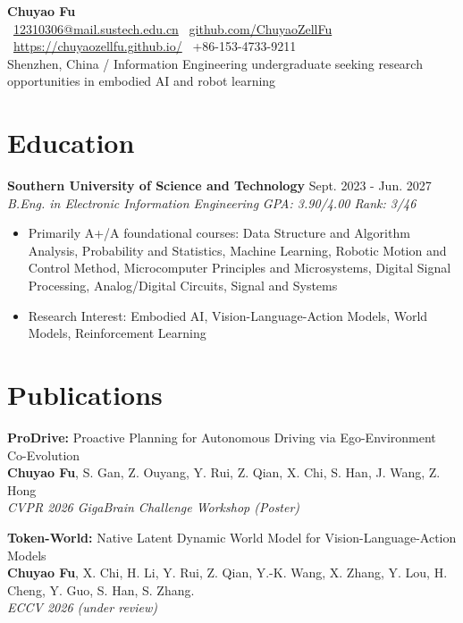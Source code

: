 \documentclass[10pt,a4paper]{article}
\newcommand{\entry}[4]{%
  \textbf{#1} \hfill #2\\
  \textit{#3} \hfill \textit{#4}\\[-0.35em]
}
\newcommand{\cvitem}[1]{\item \small #1}
\newcommand{\contactsep}{\hspace{0.7em}{\color{textgray}|}\hspace{0.7em}}
\begin{document}
{\centering
    {\LARGE\bfseries Chuyao Fu}\\[0.45em]
    {\small
    \faEnvelope\ \href{mailto:your.email@outlook.com}{12310306@mail.sustech.edu.cn}
    \contactsep
    \faGithub\ \href{https://github.com/yourname}{github.com/ChuyaoZellFu}
    \contactsep
    \faGlobe\ \href{https://your-website.com}{https://chuyaozellfu.github.io/}
    \contactsep
    \faPhone\ +86-153-4733-9211
    }\\[0.3em]
    {\small \color{textgray}Shenzhen, China \;\; / \;\; Information Engineering undergraduate seeking research opportunities in embodied AI and robot learning}
\par}

\section*{Education}
\entry{Southern University of Science and Technology}{Sept. 2023 - Jun. 2027}{B.Eng. in Electronic Information Engineering}{GPA: 3.90/4.00 Rank: 3/46}
\begin{itemize}[leftmargin=1.2em, topsep=0.2em, itemsep=0.18em]
  \cvitem{Primarily A+/A foundational courses: Data Structure and Algorithm Analysis, Probability and Statistics, Machine Learning, Robotic Motion and Control Method, Microcomputer Principles and Microsystems, Digital Signal Processing, Analog/Digital Circuits, Signal and Systems}
  \cvitem{Research Interest: Embodied AI, Vision-Language-Action Models, World Models, Reinforcement Learning}

\end{itemize}

\section*{Publications}

\noindent
\textbf{ProDrive:} Proactive Planning for Autonomous Driving via Ego-Environment Co-Evolution \\
\textbf{Chuyao Fu}, S. Gan, Z. Ouyang, Y. Rui, Z. Qian, X. Chi, S. Han, J. Wang, Z. Hong \\
\textit{CVPR 2026 GigaBrain Challenge Workshop (Poster)}

\vspace{0.9em}

\noindent

\textbf{Token-World:} Native Latent Dynamic World Model for Vision-Language-Action Models\\
\textbf{Chuyao Fu}, X. Chi, H. Li, Y. Rui, Z. Qian, Y.-K. Wang, X. Zhang, Y. Lou, H. Cheng, Y. Guo, S. Han, S. Zhang.\\
\textit{ECCV 2026 (under review)}
\end{document}
